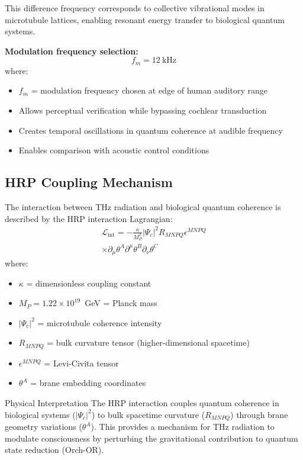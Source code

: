 This difference frequency corresponds to collective vibrational modes in microtubule lattices, enabling resonant energy transfer to biological quantum systems.

\textbf{Modulation frequency selection:}
\begin{equation}
f_m = 12~\text{kHz}
\end{equation}
where:
\begin{itemize}
\item $f_m$ = modulation frequency chosen at edge of human auditory range
\item Allows perceptual verification while bypassing cochlear transduction
\item Creates temporal oscillations in quantum coherence at audible frequency
\item Enables comparison with acoustic control conditions
\end{itemize}

\subsection{HRP Coupling Mechanism}

The interaction between THz radiation and biological quantum coherence is described by the HRP interaction Lagrangian:
\begin{equation}
\begin{split}
\mathcal{L}_{\text{int}} = -\frac{\kappa}{M_P^2} |\Psi_c|^2 R_{MNPQ} \epsilon^{MNPQ} \\
\times \partial_\mu \theta^A \partial^\mu \theta^B \partial_\nu \theta^C
\end{split}
\end{equation}
where:
\begin{itemize}
\item $\kappa$ = dimensionless coupling constant
\item $M_P = 1.22 \times 10^{19}$~GeV = Planck mass
\item $|\Psi_c|^2$ = microtubule coherence intensity
\item $R_{MNPQ}$ = bulk curvature tensor (higher-dimensional spacetime)
\item $\epsilon^{MNPQ}$ = Levi-Civita tensor
\item $\theta^A$ = brane embedding coordinates
\end{itemize}

\begin{calloutbox}{Physical Interpretation}
The HRP interaction couples quantum coherence in biological systems ($|\Psi_c|^2$) to bulk spacetime curvature ($R_{MNPQ}$) through brane geometry variations ($\theta^A$). This provides a mechanism for THz radiation to modulate consciousness by perturbing the gravitational contribution to quantum state reduction (Orch-OR).
\end{calloutbox}

